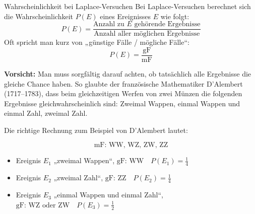 \begin{satz}
{Wahrscheinlichkeit bei Laplace-Versuchen}{}
Bei Laplace-Versuchen berechnet sich die Wahrscheinlichkeit \( P(E) \) eines Ereignisses \( E \) wie folgt:
\[
P(E) = \frac{\text{Anzahl zu } E \text{ gehörende Ergebnisse}}{\text{Anzahl aller möglichen Ergebnisse}}
\]
Oft spricht man kurz von „günstige Fälle / mögliche Fälle“:
\[
P(E) = \frac{\text{gF}}{\text{mF}}
\]
\end{satz}

\textbf{Vorsicht:} Man muss sorgfältig darauf achten, ob tatsächlich alle Ergebnisse die gleiche Chance haben. 
So glaubte der französische Mathematiker D’Alembert (1717–1783), dass beim gleichzeitigen 
Werfen von zwei Münzen die folgenden Ergebnisse gleichwahrscheinlich sind: 
Zweimal Wappen, einmal Wappen und einmal Zahl, zweimal Zahl.

Die richtige Rechnung zum Beispiel von D’Alembert lautet:

\[
\text{mF: WW, WZ, ZW, ZZ}
\]

\begin{itemize}
    \item Ereignis \( E_1 \) „zweimal Wappen“, \( \text{gF: WW} \quad P(E_1) = \frac{1}{4} \)
    \item Ereignis \( E_2 \) „zweimal Zahl“, \( \text{gF: ZZ} \quad P(E_2) = \frac{1}{4} \)
    \item Ereignis \( E_3 \) „einmal Wappen und einmal Zahl“, \( \text{gF: WZ oder ZW} \quad P(E_3) = \frac{1}{2} \)
\end{itemize}

